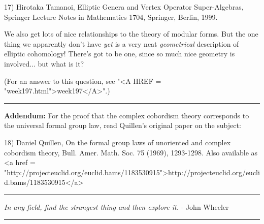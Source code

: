 17) Hirotaka Tamanoi, Elliptic Genera and Vertex Operator Super-Algebras,
Springer Lecture Notes in Mathematics 1704, Springer, Berlin, 1999.

We also get lots of nice relationships to the theory of modular forms.
But the one thing we apparently don't have \emph{yet} is a very neat 
\emph{geometrical} description of elliptic cohomology!  There's got to be 
one, since so much nice geometry is involved... but what is it?


(For an answer to this question, 
see "<A HREF = "week197.html">week197</A>".)


 \par\noindent\rule{\textwidth}{0.4pt}
\textbf{Addendum:} For the proof that the complex cobordism theory
corresponds to the universal formal group law, read Quillen's original
paper on the subject:

18) Daniel Quillen, On the formal group laws of unoriented and complex 
cobordism theory, Bull. Amer. Math. Soc. 75 (1969), 1293-1298. 
Also available as <a href = "http://projecteuclid.org/euclid.bams/1183530915">http://projecteuclid.org/euclid.bams/1183530915</a>



 \par\noindent\rule{\textwidth}{0.4pt}
\emph{In any field, find the strangest thing and then explore it.} - 
John Wheeler


 \par\noindent\rule{\textwidth}{0.4pt}


